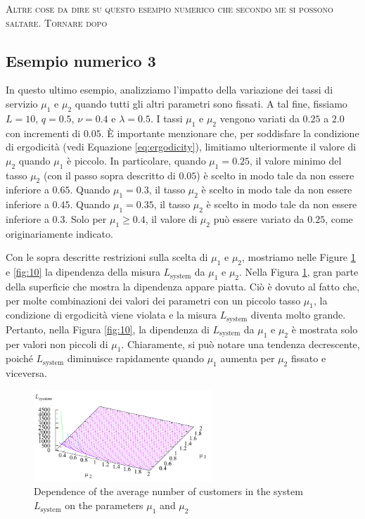 \documentclass[11pt]{article}
\begin{document}
\vspace{0.4cm}

\noindent \textsc{Altre cose da dire su questo esempio numerico che secondo me si possono saltare. Tornare dopo}

\clearpage
\subsection{Esempio numerico 3}

In questo ultimo esempio, analizziamo l'impatto della variazione dei tassi di servizio $\mu_1$ e $\mu_2$ quando tutti gli altri parametri sono fissati. A tal fine, fissiamo $L = 10$, $q = 0.5$, $\nu = 0.4$ e $\lambda = 0.5$. I tassi $\mu_1$ e $\mu_2$ vengono variati da $0.25$ a $2.0$ con incrementi di $0.05$. È importante menzionare che, per soddisfare la condizione di ergodicità (vedi Equazione \ref{eq:ergodicity}), limitiamo ulteriormente il valore di $\mu_2$ quando $\mu_1$ è piccolo. In particolare, quando $\mu_1 = 0.25$, il valore minimo del tasso $\mu_2$ (con il passo sopra descritto di $0.05$) è scelto in modo tale da non essere inferiore a $0.65$. Quando $\mu_1 = 0.3$, il tasso $\mu_2$ è scelto in modo tale da non essere inferiore a $0.45$. Quando $\mu_1 = 0.35$, il tasso $\mu_2$ è scelto in modo tale da non essere inferiore a $0.3$. Solo per $\mu_1 \geq 0.4$, il valore di $\mu_2$ può essere variato da $0.25$, come originariamente indicato.


Con le sopra descritte restrizioni sulla scelta di $\mu_1$ e $\mu_2$, mostriamo nelle Figure \ref{fig:9} e \ref{fig:10} la dipendenza della misura $L_{\text{system}}$ da $\mu_1$ e $\mu_2$. Nella Figura \ref{fig:9}, gran parte della superficie che mostra la dipendenza appare piatta. Ciò è dovuto al fatto che, per molte combinazioni dei valori dei parametri con un piccolo tasso $\mu_1$, la condizione di ergodicità viene violata e la misura $L_{\text{system}}$ diventa molto grande. Pertanto, nella Figura \ref{fig:10}, la dipendenza di $L_{\text{system}}$ da $\mu_1$ e $\mu_2$ è mostrata solo per valori non piccoli di $\mu_1$. Chiaramente, si può notare una tendenza decrescente, poiché $L_{\text{system}}$ diminuisce rapidamente quando $\mu_1$ aumenta per $\mu_2$ fissato e viceversa.

\begin{figure}[h]
    \centering
    \includegraphics[width=0.6\textwidth]{9LBRzWR.png}
    \caption{Dependence of the average number of customers in the system $L_\mathrm{system}$ on the parameters
    $\mu_1$ and $\mu_2$}
    \label{fig:9}
\end{figure}
\end{document}
